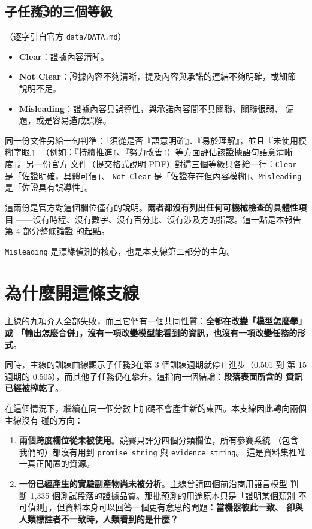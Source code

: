 \documentclass[11pt,a4paper]{ctexart}
\newcommand{\fn}[1]{\texttt{#1}}
\begin{document}
\subsection{子任務\textcircled{3}的三個等級}（逐字引自官方 \texttt{data/DATA.md}）
\begin{itemize}[leftmargin=2em, itemsep=2pt]
  \item \textbf{Clear}：證據內容清晰。
  \item \textbf{Not Clear}：證據內容不夠清晰，提及內容與承諾的連結不夠明確，或細節
        說明不足。
  \item \textbf{Misleading}：證據內容具誤導性，與承諾內容間不具關聯、關聯很弱、
        偏題，或是容易造成誤解。
\end{itemize}

同一份文件另給一句判準：「須從是否『語意明確』、『易於理解』，並且『未使用模糊字眼』
（例如：『持續推進』、『努力改善』）等方面評估該證據語句語意清晰度」。另一份官方
文件（提交格式說明 PDF）對這三個等級只各給一行：\fn{Clear} 是「佐證明確，具體可信」、
\fn{Not Clear} 是「佐證存在但內容模糊」、\fn{Misleading} 是「佐證具有誤導性」。

\begin{tcolorbox}[colback=gray!8, colframe=gray!55]
這兩份是官方對這個欄位僅有的說明。\textbf{兩者都沒有列出任何可機械檢查的具體性項目}
——沒有時程、沒有數字、沒有百分比、沒有涉及方的指認。這一點是本報告第 4 部分整條論證
的起點。
\end{tcolorbox}

\fn{Misleading} 是漂綠偵測的核心，也是本支線第二部分的主角。

\section{為什麼開這條支線}

主線的九項介入全部失敗，而且它們有一個共同性質：\textbf{全都在改變「模型怎麼學」或
「輸出怎麼合併」，沒有一項改變模型能看到的資訊，也沒有一項改變任務的形式}。

同時，主線的訓練曲線顯示子任務\textcircled{3}在第 3 個訓練週期就停止進步（0.501 到
第 15 週期的 0.505），而其他子任務仍在攀升。這指向一個結論：\textbf{段落表面所含的
資訊已經被榨乾了}。

在這個情況下，繼續在同一個分數上加碼不會產生新的東西。本支線因此轉向兩個主線沒有
碰的方向：

\begin{enumerate}[leftmargin=2em, itemsep=3pt]
  \item \textbf{兩個跨度欄位從未被使用}。競賽只評分四個分類欄位，所有參賽系統
        （包含我們的）都沒有用到 \fn{promise\_string} 與 \fn{evidence\_string}。
        這是資料集裡唯一真正閒置的資源。
  \item \textbf{一份已經產生的實驗副產物尚未被分析}。主線曾請四個前沿商用語言模型
        判斷 1{,}335 個測試段落的證據品質。那批預測的用途原本只是「證明某個類別
        不可偵測」，但資料本身可以回答一個更有意思的問題：\textbf{當機器彼此一致、
        卻與人類標註者不一致時，人類看到的是什麼？}
\end{enumerate}
\end{document}
